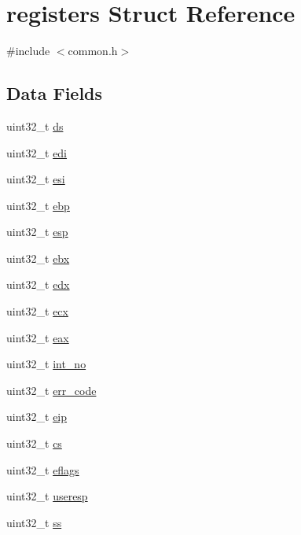 \hypertarget{structregisters}{}\section{registers Struct Reference}
\label{structregisters}


{\ttfamily \#include $<$common.\+h$>$}

\subsection*{Data Fields}
\begin{DoxyCompactItemize}
\item 
uint32\+\_\+t \hyperlink{structregisters_a806ec3ba0cf965d456601aea4c039ec3}{ds}
\item 
uint32\+\_\+t \hyperlink{structregisters_aeedcb447fe6640d43d09c27b7cb8db3b}{edi}
\item 
uint32\+\_\+t \hyperlink{structregisters_a8da011d75d93d36da6c4cf28e1fa3179}{esi}
\item 
uint32\+\_\+t \hyperlink{structregisters_a8d156d1d27fcb1c2f2bbcce1a784431f}{ebp}
\item 
uint32\+\_\+t \hyperlink{structregisters_a9cc3091e4c0f25d142ac74443dc8d384}{esp}
\item 
uint32\+\_\+t \hyperlink{structregisters_aa8989b2fef42dca1d656f724eb324f51}{ebx}
\item 
uint32\+\_\+t \hyperlink{structregisters_af3b40afa73ecdaf2c9279b9ed482d26b}{edx}
\item 
uint32\+\_\+t \hyperlink{structregisters_a00ce491148fd90800c18bd2d4c22e090}{ecx}
\item 
uint32\+\_\+t \hyperlink{structregisters_a1e01e806248cd98e55e0b053db6a6a51}{eax}
\item 
uint32\+\_\+t \hyperlink{structregisters_af311750a9b18afb3b1ed2d144fbe1cb0}{int\+\_\+no}
\item 
uint32\+\_\+t \hyperlink{structregisters_a1f90b3d484c66002c9ffcd0e54e97c2c}{err\+\_\+code}
\item 
uint32\+\_\+t \hyperlink{structregisters_aaeedf83509826a731e436025aeb53576}{eip}
\item 
uint32\+\_\+t \hyperlink{structregisters_a7d73555c87de229a90292640f544ab27}{cs}
\item 
uint32\+\_\+t \hyperlink{structregisters_af9a17981c1cdac71d6f82ba32466a036}{eflags}
\item 
uint32\+\_\+t \hyperlink{structregisters_ad4734529e5faf04f6c61cfabfe4324e9}{useresp}
\item 
uint32\+\_\+t \hyperlink{structregisters_a0da8015246d96b8dcebe98c945fd3d61}{ss}
\end{DoxyCompactItemize}


